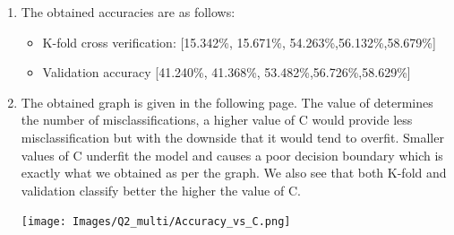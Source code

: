 \begin{enumerate}[label=(\alph*)]
    \item The obtained accuracies are as follows:
    \begin{itemize}
        \item K-fold cross verification: [15.342\%, 15.671\%, 54.263\%,56.132\%,58.679\%]
        \item Validation accuracy [41.240\%, 41.368\%, 53.482\%,56.726\%,58.629\%]
    \end{itemize}
    \item The obtained graph is given in the following page. The value of determines the number of misclassifications, a higher value of C would provide less misclassification but with the downside that it would tend to overfit. Smaller values of C underfit the model and causes a poor decision boundary which is exactly what we obtained as per the graph.
    We also see that both K-fold and validation classify better the higher the value of C.

        \begin{center}
            \texttt{[image: Images/Q2\_multi/Accuracy\_vs\_C.png]}
        \end{center}

\end{enumerate}


